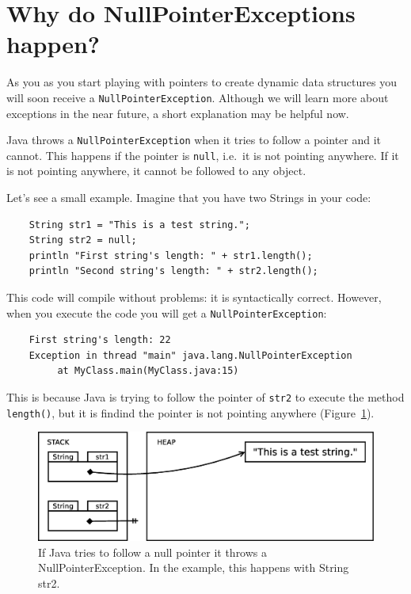 \section{Why do NullPointerExceptions happen?}
\label{sec:why-do-nullp}

As you as you start playing with pointers to create dynamic data
structures you will soon receive a
\verb+NullPointerException+. Although we will learn more about
exceptions in the near future, a short explanation may be helpful
now. 

Java throws a \verb+NullPointerException+ when it tries to follow a
pointer and it cannot. This happens if the pointer is \verb+null+,
i.e.~it is not pointing anywhere. If it is not pointing anywhere, it
cannot be followed to any object. 

Let's see a small example. Imagine that you have two Strings in your
code: 

\begin{verbatim}
    String str1 = "This is a test string.";
    String str2 = null;
    println "First string's length: " + str1.length();
    println "Second string's length: " + str2.length();
\end{verbatim}

This code will compile without problems: it is syntactically
correct. However, when you execute the code you will get a
\verb+NullPointerException+: 

\begin{verbatim}
    First string's length: 22
    Exception in thread "main" java.lang.NullPointerException
         at MyClass.main(MyClass.java:15)
\end{verbatim}

This is because Java is trying to follow the pointer of \verb+str2+ to
execute the method \verb+length()+, but it is findind the pointer is
not pointing anywhere (Figure~\ref{fig:uilll}). 

\begin{figure}[htbp]
  \centering
  \includegraphics[width=\textwidth]{gfx/null-pointer-exception}
  \caption{If Java tries to follow a null pointer it throws a
    NullPointerException. In the example, this happens with String
    str2.} 
  \label{fig:uilll}
\end{figure}

